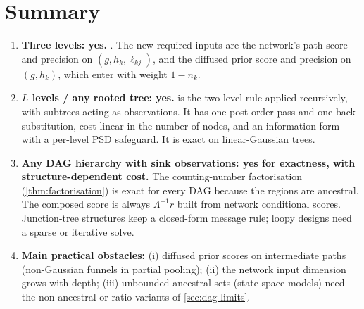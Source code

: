 \documentclass[11pt]{article}
\theoremstyle{definition}
\theoremstyle{remark}
\begin{document}
\section{Summary}\label{sec:summary}

\begin{enumerate}
\item \textbf{Three levels: yes.} .
 The new required inputs are the network's path score and precision on
 $(g,h_k,\ell_{kj})$, and the diffused prior score and precision on $(g,h_k)$,
 which enter with weight $1-n_k$.
\item \textbf{$L$ levels / any rooted tree: yes.}  is the
 two-level rule applied recursively, with subtrees acting as observations. It has
 one post-order pass and one back-substitution, cost linear in the number of
 nodes, and an information form with a per-level PSD safeguard. It is exact on
 linear-Gaussian trees.
\item \textbf{Any DAG hierarchy with sink observations: yes for exactness, with
 structure-dependent cost.} The counting-number factorisation
 (\cref{thm:factorisation}) is exact for every DAG because the regions are
 ancestral. The composed score is always $\Lambda^{-1}r$ built from network
 conditional scores. Junction-tree structures keep a closed-form message rule;
 loopy designs need a sparse or iterative solve.
\item \textbf{Main practical obstacles:} (i) diffused prior scores on intermediate
 paths (non-Gaussian funnels in partial pooling); (ii) the network input
 dimension grows with depth; (iii) unbounded ancestral sets (state-space models)
 need the non-ancestral or ratio variants of \cref{sec:dag-limits}.
\end{enumerate}
\end{document}
